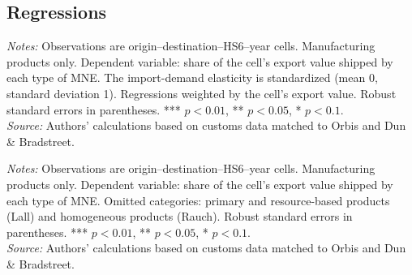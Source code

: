 \documentclass[11pt,a4paper]{article}
\begin{document}
\subsection{Regressions}
\begin{table}[H]\centering\small%
  \caption{Manufacturing: Product Characteristics and Multinational Shares}%
  \label{tab:fgo_r_manufacturing}%
  \par\vspace{3pt}%
  \begin{minipage}{0.95\textwidth}\footnotesize %
  \textit{Notes:} Observations are origin--destination--HS6--year cells. Manufacturing products only. Dependent variable: share of the cell's export value shipped by each type of MNE. The import-demand elasticity is standardized (mean 0, standard deviation 1). Regressions weighted by the cell's export value. Robust standard errors in parentheses. *** $p<0.01$, ** $p<0.05$, * $p<0.1$.\\[3pt]%
  \textit{Source:} Authors' calculations based on customs data matched to Orbis and Dun \& Bradstreet.%
  \end{minipage}%
  \end{table}
\begin{table}[H]\centering\footnotesize%
  \caption{Manufacturing: Product Sophistication and Multinational Shares}%
  \label{tab:meas_r_manufacturing}%
  \par\vspace{3pt}%
  \begin{minipage}{0.95\textwidth}\footnotesize %
  \textit{Notes:} Observations are origin--destination--HS6--year cells. Manufacturing products only. Dependent variable: share of the cell's export value shipped by each type of MNE. Omitted categories: primary and resource-based products (Lall) and homogeneous products (Rauch). Robust standard errors in parentheses. *** $p<0.01$, ** $p<0.05$, * $p<0.1$.\\[3pt]%
  \textit{Source:} Authors' calculations based on customs data matched to Orbis and Dun \& Bradstreet.%
  \end{minipage}%
  \end{table}
\end{document}
